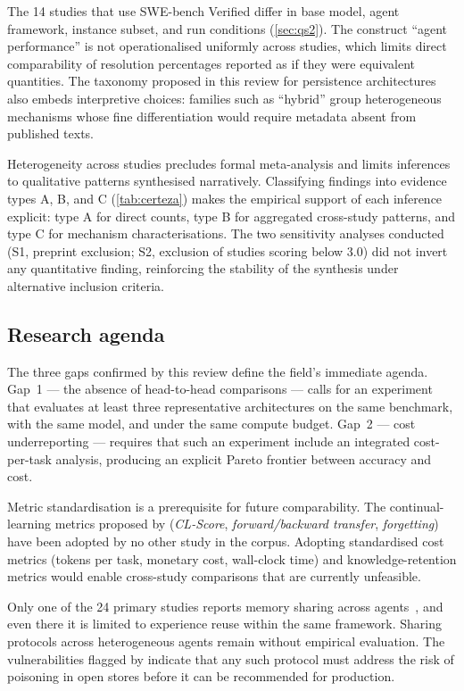 The 14 studies that use SWE-bench Verified differ in base model, agent
framework, instance subset, and run conditions (\autoref{sec:qs2}).
The construct ``agent performance'' is not operationalised uniformly
across studies, which limits direct comparability of resolution
percentages reported as if they were equivalent quantities.
The taxonomy proposed in this review for persistence architectures also
embeds interpretive choices: families such as ``hybrid'' group
heterogeneous mechanisms whose fine differentiation would require
metadata absent from published texts.

Heterogeneity across studies precludes formal meta-analysis and limits
inferences to qualitative patterns synthesised narratively.
Classifying findings into evidence types A, B, and C
(\autoref{tab:certeza}) makes the empirical support of each inference
explicit: type A for direct counts, type B for aggregated cross-study
patterns, and type C for mechanism characterisations.
The two sensitivity analyses conducted (S1, preprint exclusion;
S2, exclusion of studies scoring below 3.0) did not invert any
quantitative finding, reinforcing the stability of the synthesis under
alternative inclusion criteria.

\subsection{Research agenda}
\label{sec:agenda-pesquisa}

The three gaps confirmed by this review define the field's immediate
agenda.
Gap~1 --- the absence of head-to-head comparisons --- calls for an
experiment that evaluates at least three representative architectures
on the same benchmark, with the same model, and under the same compute
budget.
Gap~2 --- cost underreporting --- requires that such an experiment
include an integrated cost-per-task analysis, producing an explicit
Pareto frontier between accuracy and cost.

Metric standardisation is a prerequisite for future comparability.
The continual-learning metrics proposed by
\citet{joshi2025swebenchcl} (\textit{CL-Score},
\textit{forward/backward transfer}, \textit{forgetting}) have been
adopted by no other study in the corpus.
Adopting standardised cost metrics (tokens per task, monetary cost,
wall-clock time) and knowledge-retention metrics would enable
cross-study comparisons that are currently unfeasible.

Only one of the 24 primary studies reports memory sharing across
agents~\citep{chen2025sweexp}, and even there it is limited to
experience reuse within the same framework.
Sharing protocols across heterogeneous agents remain without empirical
evaluation.
The vulnerabilities flagged by \citet{srivastava2025memorygraft}
indicate that any such protocol must address the risk of poisoning in
open stores before it can be recommended for production.
